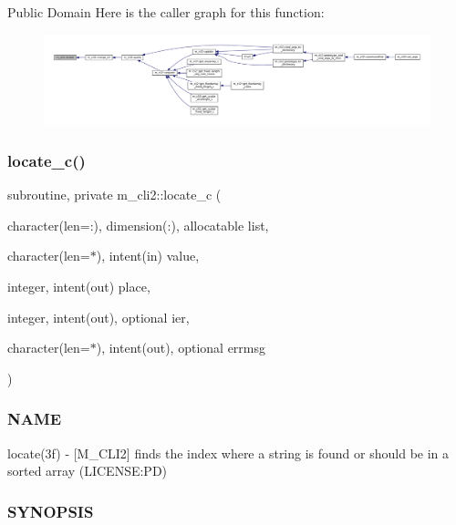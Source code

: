 Public Domain Here is the caller graph for this function\+:\nopagebreak
\begin{figure}[H]
\begin{center}
\leavevmode
\includegraphics[width=350pt]{namespacem__cli2_ad13853611abfee00d40ffa020662ec8a_icgraph}
\end{center}
\end{figure}
\mbox{\label{namespacem__cli2_a2199778fea512efcde8778f20765643a}} 
\subsubsection{\texorpdfstring{locate\+\_\+c()}{locate\_c()}}
{\footnotesize\ttfamily subroutine, private m\+\_\+cli2\+::locate\+\_\+c (\begin{DoxyParamCaption}\item[{character(len=\+:), dimension(\+:), allocatable}]{list,  }\item[{character(len=$\ast$), intent(in)}]{value,  }\item[{integer, intent(out)}]{place,  }\item[{integer, intent(out), optional}]{ier,  }\item[{character(len=$\ast$), intent(out), optional}]{errmsg }\end{DoxyParamCaption})\hspace{0.3cm}{\ttfamily [private]}}



\subsubsection*{N\+A\+ME}

locate(3f) -\/ \mbox{[}M\+\_\+\+C\+L\+I2\mbox{]} finds the index where a string is found or should be in a sorted array (L\+I\+C\+E\+N\+SE\+:PD) 

\subsubsection*{S\+Y\+N\+O\+P\+S\+IS}

